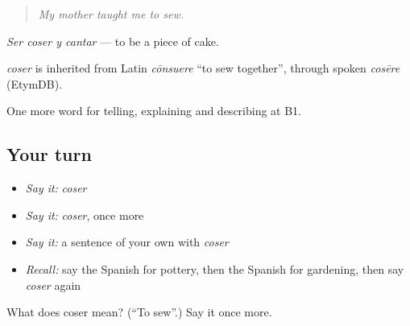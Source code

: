\begin{quote}
\emph{My mother taught me to sew.}
\end{quote}

\emph{Ser coser y cantar} — to be a piece of cake.

\begin{cousinweb}
\emph{coser} is inherited from Latin \emph{cōnsuere} \textquotedblleft{}to sew together\textquotedblright{}, through spoken \emph{cosēre} (EtymDB).
\end{cousinweb}

\begin{grammarlens}[title={What you've built}]
One more word for telling, explaining and describing at B1.
\end{grammarlens}

\subsection*{Your turn}
\begin{itemize}
\raggedright
  \item \emph{Say it:} \emph{coser}
  \item \emph{Say it:} \emph{coser}, once more
  \item \emph{Say it:} a sentence of your own with \emph{coser}
  \item \emph{Recall:} say the Spanish for pottery, then the Spanish for gardening, then say \emph{coser} again
\end{itemize}

\begin{tcolorbox}[breakable,colback=teal!4,colframe=teal!35!black,title={Before you move on}]
What does coser mean? (\textquotedblleft{}To sew\textquotedblright{}.) Say it once more.
\end{tcolorbox}
